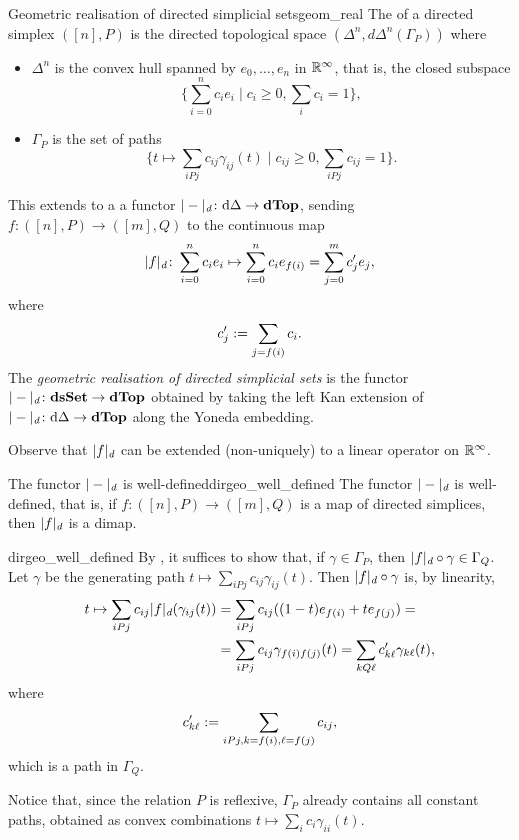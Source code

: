 \begin{cdef}{Geometric realisation of directed simplicial sets}{geom_real}
	The  of a directed simplex \( ([n], P) \) is the directed topological space \( (\Delta^n, d\Delta^n(\Gamma_P)) \) where 
\begin{itemize}
	\item \( \Delta^n \) is the convex hull spanned by \( e_0, \ldots, e_n \) in \( \mathbb{R}^\infty \), that is, the closed subspace
		\begin{equation*}
			\{ \sum_{i=0}^n c_i e_i \mid c_i \geq 0, \sum_{i}c_i = 1 \},
		\end{equation*}
	\item \( \Gamma_P \) is the set of paths
		\begin{equation*}
			\{ t \mapsto \sum_{iPj} c_{ij} \gamma_{ij}(t) \mid c_{ij} \geq 0, \sum_{iPj} c_{ij} = 1 \}.
		\end{equation*}
\end{itemize}
This extends to a a functor \( |-|_\textit{d}\colon \mathrm{d}\Delta \to \mathbf{dTop} \), sending \( f\colon ([n], P) \to ([m], Q) \) to the continuous map
\begin{equation*}
	|f|_\textit{d} \colon \sum_{i=0}^n c_i e_i \mapsto \sum_{i=0}^n c_i e_{f(i)} = \sum_{j=0}^m c'_j e_j,
\end{equation*}
where 
\begin{equation*}
	c'_j := \sum_{j = f(i)} c_i.
\end{equation*}
The \emph{geometric realisation of directed simplicial sets} is the functor \( |-|_\textit{d}\colon \mathbf{dsSet} \to \mathbf{dTop} \) obtained by taking the left Kan extension of \( |-|_\textit{d}\colon \mathrm{d}\Delta \to \mathbf{dTop} \) along the Yoneda embedding.
\end{cdef}

Observe that \( |f|_\textit{d} \) can be extended (non-uniquely) to a linear operator on \( \mathbb{R}^\infty \).

\begin{clem}{The functor \( |-|_\textit{d} \) is well-defined}{dirgeo_well_defined}
	The functor \( |-|_\textit{d} \) is well-defined, that is, if \( f\colon ([n], P) \to ([m], Q) \) is a map of directed simplices, then \( |f|_\textit{d} \) is a dimap.
\end{clem}
\begin{lemproof}{dirgeo_well_defined}
By , it suffices to show that, if \( \gamma \in \Gamma_P \), then \( |f|_\textit{d} \circ \gamma \in \Gamma_Q \).
Let \( \gamma \) be the generating path \( t \mapsto \sum_{iPj} c_{ij} \gamma_{ij}(t) \).
Then \( |f|_\textit{d} \circ \gamma \) is, by linearity,
\begin{align*}
	t \mapsto \sum_{iPj} c_{ij} |f|_\textit{d}(\gamma_{ij}(t)) 
	& = \sum_{iPj} c_{ij} ((1-t) e_{f(i)} + te_{f(j)}) = \\
	& = \sum_{iPj} c_{ij} \gamma_{f(i)f(j)}(t) = \sum_{kQ\ell} c'_{k\ell} \gamma_{k\ell}(t),
\end{align*}
where
\begin{equation*}
	c'_{k\ell} := \sum_{iPj, k=f(i), \ell=f(j)} c_{ij},
\end{equation*}
which is a path in \( \Gamma_Q \).
\end{lemproof}

Notice that, since the relation \( P \) is reflexive, \( \Gamma_P \) already contains all constant paths, obtained as convex combinations \( t \mapsto \sum_{i} c_i \gamma_{ii}(t) \).
